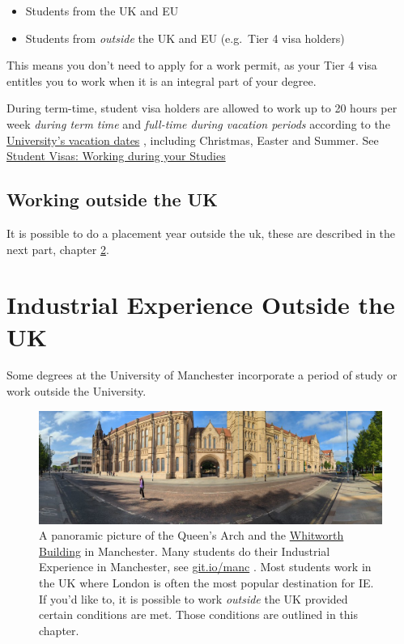 \documentclass[
]{book}
\providecommand{\tightlist}{%
  \setlength{\itemsep}{0pt}\setlength{\parskip}{0pt}}
\begin{document}
\begin{itemize}
\tightlist
\item
  Students from the UK and EU
\item
  Students from \emph{outside} the UK and EU (e.g.~Tier 4 visa holders)
\end{itemize}

This means you don't need to apply for a work permit, as your Tier 4 visa entitles you to work when it is an integral part of your degree.

During term-time, student visa holders are allowed to work up to 20 hours per week \emph{during term time} and \emph{full-time during vacation periods} according to the \href{https://www.manchester.ac.uk/discover/key-dates}{University's vacation dates} \citep{keydates}, including Christmas, Easter and Summer. See \href{https://www.studentsupport.manchester.ac.uk/immigration-and-visas/working/working-during-your-studies/}{Student Visas: Working during your Studies} \citep{workingduringstudy}

\section{Working outside the UK}\label{working-outside-the-uk}

It is possible to do a placement year outside the uk, these are described in the next part, chapter \ref{notuk}.

\chapter{Industrial Experience Outside the UK}\label{notuk}

Some degrees at the University of Manchester incorporate a period of study or work outside the University. \citep{studyabroad}

\begin{figure}

{\centering \includegraphics{images/queensarch} 

}

\caption{A panoramic picture of the Queen's Arch and the \href{https://en.wikipedia.org/wiki/Whitworth_Building}{Whitworth Building} in Manchester. Many students do their Industrial Experience in Manchester, see \href{https://git.io/manc}{git.io/manc} \citep{manc}. Most students work in the UK where London is often the most popular destination for IE. If you'd like to, it is possible to work \emph{outside} the UK provided certain conditions are met. Those conditions are outlined in this chapter.}\label{fig:rothwell-fig}
\end{figure}
\end{document}
